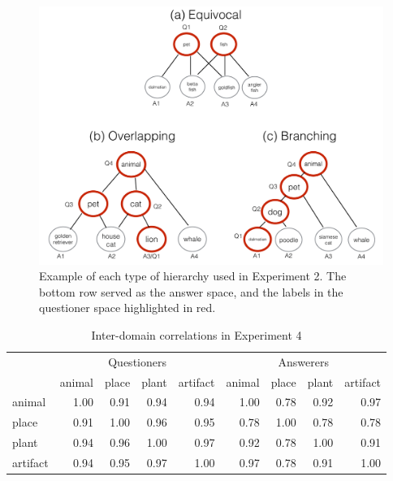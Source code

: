 \documentclass[12pt, floatsintext, jou]{apa6}
\begin{document}
	\begin{figure}[t!]
\begin{center}
\includegraphics[scale = .3]{hierarchyStructureExamples}
\end{center}
\caption{Example of each type of hierarchy used in Experiment 2. The bottom row served as the answer space, and the labels in the questioner space highlighted in red. }
\label{fig:hierarchyStructures}
\end{figure}
\begin{table}[t!]
\centering
\begin{tabular}{ p{1.5cm} | r | r | r | r |||||| r | r | r | r |}
& \multicolumn{4}{c||||||}{Questioners} & \multicolumn{4}{c}{Answerers} \\
&             animal &     place &     plant &  artifact &            animal &     place &     plant &  artifact \\
\hline
animal &   1.00 &  0.91 & 0.94 & 0.94 & 1.00 & 0.78 & 0.92 &  0.97 \\
\hline
place &    0.91 &  1.00 & 0.96 & 0.95 & 0.78 & 1.00 &  0.78 & 0.78 \\
\hline
plant &    0.94 & 0.96 & 1.00 & 0.97 & 0.92  & 0.78 &  1.00 & 0.91\\
\hline
artifact & 0.94 & 0.95 & 0.97 & 1.00 & 0.97 & 0.78 &  0.91 & 1.00\\
\end{tabular}
\\[1.5pt]
\caption{Inter-domain correlations in Experiment 4} 
\label{table:experiment4correlations}
\end{table}
\end{document}
